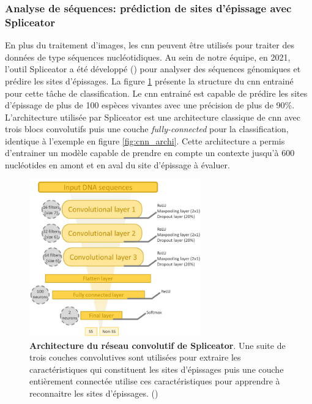 \subsubsection{Analyse de séquences: prédiction de sites d'épissage avec Spliceator}
En plus du traitement d'images, les \gls{cnn} peuvent être utilisés pour traiter des données de type séquences nucléotidiques. Au sein de notre équipe, en 2021, l'outil Spliceator a été développé (\cite{scalzitti_spliceator_2021}) pour analyser des séquences génomiques et prédire les sites d'épissages. La figure \ref{fig:splice_archi} présente la structure du \gls{cnn} entrainé pour cette tâche de classification. Le \gls{cnn} entrainé est capable de prédire les sites d'épissage de plus de 100 espèces vivantes avec une précision de plus de 90\%. L'architecture utilisée par Spliceator est une architecture classique de \gls{cnn} avec trois blocs convolutifs puis une couche \textit{fully-connected} pour la classification, identique à l'exemple en figure \ref{fig:cnn_archi}. Cette architecture a permis d'entrainer un modèle capable de prendre en compte un contexte jusqu'à 600 nucléotides en amont et en aval du site d'épissage à évaluer.
\begin{figure}[!htbp]
 \centering
 \includegraphics[width=0.66\textwidth]{figures/spliceator_nn.png}
 \caption[Architecture du réseau convolutionel de Spliceator]{\textbf{Architecture du réseau convolutif de Spliceator}. Une suite de trois couches convolutives sont utilisées pour extraire les caractéristiques qui constituent les sites d'épissages puis une couche entièrement connectée utilise ces caractéristiques pour apprendre à reconnaitre les sites d'épissages. (\cite{scalzitti_spliceator_2021})}
 \label{fig:splice_archi}
\end{figure}

